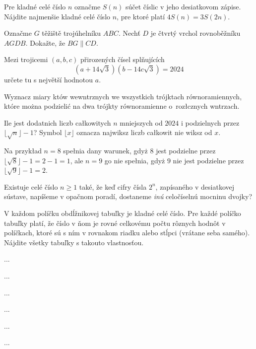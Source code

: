 {%
Pre kladné celé číslo $n$ označme $S(n)$ súčet číslic v jeho desiatkovom zápise. Nájdite najmenšie kladné celé číslo $n$, pre ktoré platí
$4 S(n) = 3 S(2 n).$}

{%
Označme $G$ těžiště trojúhelníku $ABC$. Nechť $D$ je čtvrtý vrchol rovnoběžníku $AGDB$. Dokažte, že $BG \parallel CD$.}

{%
Mezi trojicemi $(a,b,c)$ přirozených čísel splňujících
$$
\left(a+14\sqrt{3}\right)\left(b-14c\sqrt{3}\right)=2024
$$
určete tu s největší hodnotou $a$.}

{%
Wyznacz miary k\ą{}tów wewn\ę{}trznych we wszystkich trójk\ą{}tach równoramiennych, które można podzielić na dwa trójk\ą{}ty równoramienne o~roz\l{}\ą{}cznych wn\ę{}trzach. }

{%
Ile jest dodatnich liczb ca\l{}kowitych $n$ mniejszych od $2024$ i podzielnych przez $\lfloor \sqrt{n}\rfloor-1$? Symbol $\lfloor x\rfloor$ oznacza najwi\ę{}ksz\ą{} liczb\ę{} ca\l{}kowit\ą{} nie wi\ę{}ksz\ą{} od $x$.

\nopagebreak\smallskip\noindent
Na przyk\l{}ad $n=8$ spe\l{}nia dany warunek, gdyż $8$ jest podzielne przez $\lfloor\sqrt{8}\rfloor-1=2-1=1$, ale $n=9$ go nie spe\l{}nia, gdyż $9$ nie jest podzielne przez $\lfloor \sqrt{9}\rfloor -1=2$.}

{%
Existuje celé číslo $n\geq 1$ také, že keď cifry čísla $2^n$, zapísaného v desiatkovej sústave, napíšeme v opačnom poradí, dostaneme \emph{inú} celočíselnú mocninu dvojky?}

{%
V každom políčku obdĺžnikovej tabuľky je kladné celé číslo. Pre každé políčko tabuľky platí, že číslo v ňom je rovné celkovému počtu rôznych hodnôt v políčkach, ktoré sú s ním v rovnakom riadku alebo stĺpci (vrátane seba samého). Nájdite všetky tabuľky s takouto vlastnosťou.}

{%
...}

{%
...}

{%
...}

{%
...}

{%
...}

{%
...}

